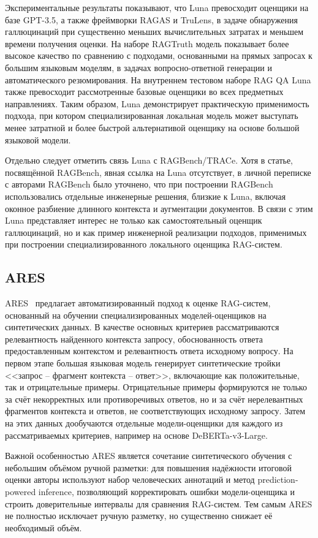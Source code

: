 Экспериментальные результаты показывают, что Luna превосходит оценщики 
на базе GPT-3.5, а также фреймворки RAGAS и TruLens, в задаче обнаружения 
галлюцинаций при существенно меньших вычислительных затратах и меньшем времени 
получения оценки. На наборе RAGTruth модель показывает более высокое качество 
по сравнению с подходами, основанными на прямых запросах к большим языковым 
моделям, в задачах вопросно-ответной генерации и автоматического резюмирования. 
На внутреннем тестовом наборе RAG QA Luna также превосходит рассмотренные 
базовые оценщики во всех предметных направлениях. Таким образом, Luna 
демонстрирует практическую применимость подхода, при котором специализированная 
локальная модель может выступать менее затратной и более быстрой альтернативой 
оценщику на основе большой языковой модели.

Отдельно следует отметить связь Luna с RAGBench/TRACe. Хотя в статье, 
посвящённой RAGBench, явная ссылка на Luna отсутствует, в личной переписке с авторами RAGBench было уточнено, что при построении 
RAGBench использовались отдельные инженерные решения, близкие к Luna, включая 
оконное разбиение длинного контекста и аугментации документов. В связи с этим 
Luna представляет интерес не только как самостоятельный оценщик галлюцинаций, 
но и как пример инженерной реализации подходов, применимых при построении 
специализированного локального оценщика RAG-систем.

\subsection{ARES}
\label{sec:ares}

ARES~\cite{saad2023ares} предлагает автоматизированный подход к оценке
RAG-систем, основанный на обучении специализированных моделей-оценщиков
на синтетических данных. В качестве основных критериев 
рассматриваются релевантность найденного контекста запросу, обоснованность 
ответа предоставленным контекстом и релевантность ответа исходному вопросу. 
На первом этапе большая языковая модель генерирует синтетические тройки 
<<запрос -- фрагмент контекста -- ответ>>, включающие как положительные, 
так и отрицательные примеры. Отрицательные примеры формируются не только 
за счёт некорректных или противоречивых ответов, но и за счёт нерелевантных 
фрагментов контекста и ответов, не соответствующих исходному запросу. 
Затем на этих данных дообучаются отдельные модели-оценщики для каждого 
из рассматриваемых критериев, например на основе DeBERTa-v3-Large.

Важной особенностью ARES является сочетание синтетического обучения 
с небольшим объёмом ручной разметки: для повышения надёжности итоговой 
оценки авторы используют набор человеческих аннотаций и метод 
prediction-powered inference, позволяющий корректировать ошибки 
модели-оценщика и строить доверительные интервалы для сравнения RAG-систем. 
Тем самым ARES не полностью исключает ручную разметку, но существенно 
снижает её необходимый объём.

